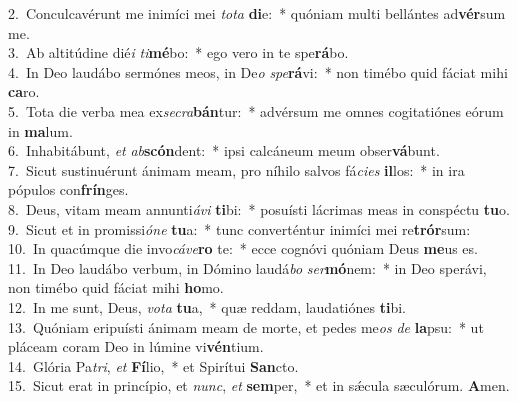 {2.~}Conculcavérunt me inimíci mei \textit{to}\textit{ta} \textbf{di}e:~* quóniam multi bellántes ad\textbf{vér}sum me.\\
{3.~}Ab altitúdine dié\textit{i} \textit{ti}\textbf{mé}bo:~* ego vero in te spe\textbf{rá}bo.\\
{4.~}In Deo laudábo sermónes meos, in De\textit{o} \textit{spe}\textbf{rá}vi:~* non timébo quid fáciat mihi \textbf{ca}ro.\\
{5.~}Tota die verba mea ex\textit{se}\textit{cra}\textbf{bán}tur:~* advérsum me omnes cogitatiónes eórum in \textbf{ma}lum.\\
{6.~}Inhabitábunt, \textit{et} \textit{ab}\textbf{scón}dent:~* ipsi calcáneum meum obser\textbf{vá}bunt.\\
{7.~}Sicut sustinuérunt ánimam meam, pro níhilo salvos fá\textit{ci}\textit{es} \textbf{il}los:~* in ira pópulos con\textbf{frín}ges.\\
{8.~}Deus, vitam meam annunti\textit{á}\textit{vi} \textbf{ti}bi:~* posuísti lácrimas meas in conspéctu \textbf{tu}o.\\
{9.~}Sicut et in promissi\textit{ó}\textit{ne} \textbf{tu}a:~* tunc converténtur inimíci mei re\textbf{trór}sum:\\
{10.~}In quacúmque die invo\textit{cá}\textit{ve}\textbf{ro} te:~* ecce cognóvi quóniam Deus \textbf{me}us es.\\
{11.~}In Deo laudábo verbum, in Dómino laudá\textit{bo} \textit{ser}\textbf{mó}nem:~* in Deo sperávi, non timébo quid fáciat mihi \textbf{ho}mo.\\
{12.~}In me sunt, Deus, \textit{vo}\textit{ta} \textbf{tu}a,~* quæ reddam, laudatiónes \textbf{ti}bi.\\
{13.~}Quóniam eripuísti ánimam meam de morte, et pedes me\textit{os} \textit{de} \textbf{la}psu:~* ut pláceam coram Deo in lúmine vi\textbf{vén}tium.\\
{14.~}Glória Pa\textit{tri}, \textit{et} \textbf{Fí}lio,~* et Spirítui \textbf{San}cto.\\
{15.~}Sicut erat in princípio, et \textit{nunc}, \textit{et} \textbf{sem}per,~* et in sǽcula sæculórum. \textbf{A}men.\\

